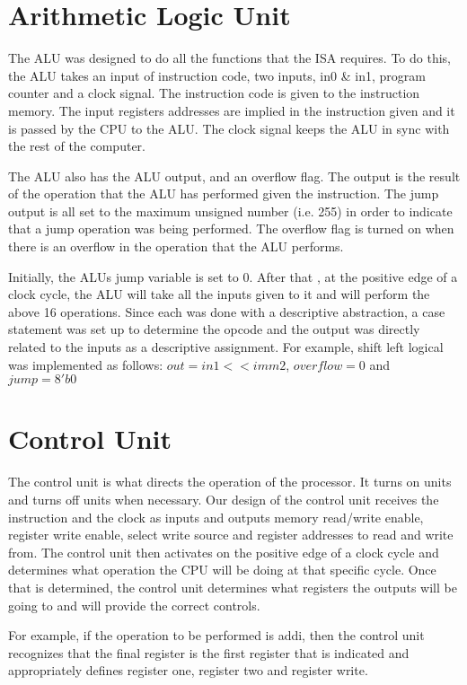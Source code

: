 \documentclass[journal]{IEEEtran}
\begin{document}
\section{Arithmetic Logic Unit}
The ALU was designed to do all the functions that the ISA requires. To do this, the ALU takes an input of instruction code, two inputs, in0 \& in1, program counter and a clock signal. The instruction code is given to the instruction memory. The input registers addresses are implied in the instruction given and it is passed by the CPU to the ALU. The clock signal keeps the ALU in sync with the rest of the computer. 

The ALU also has the ALU output, and an overflow flag. The output is the result of the operation that the ALU has performed given the instruction. The jump output is all set to the maximum unsigned number (i.e. 255) in order to indicate that a jump operation was being performed.  The overflow flag is turned on when there is an overflow in the operation that the ALU performs. 

Initially, the ALUs jump variable is set to 0. After that , at the positive edge of a clock cycle, the ALU will take all the inputs given to it and will perform the above 16 operations. Since each was done with a descriptive abstraction, a case statement was set up to determine the opcode and the output was directly related to the inputs as a descriptive assignment. For example, shift left logical was implemented as follows: $ out = in1<<imm2 $, $overflow  = 0$ and $jump = 8'b0$ 


\section{Control Unit}
The control unit is what directs the operation of the processor. It turns on units and turns off units when necessary. Our design of the control unit receives the instruction and the clock as inputs and outputs memory read/write enable, register write enable, select write source and register addresses to read and write from. The control unit then activates on the positive edge of a clock cycle and determines what operation the CPU will be doing at that specific cycle. Once that is determined, the control unit determines what registers the outputs will be going to and will provide the correct controls. 

For example, if the operation to be performed is addi, then the control unit recognizes that the final register is the first register that is indicated and appropriately defines register one, register two and register write. 
\end{document}

